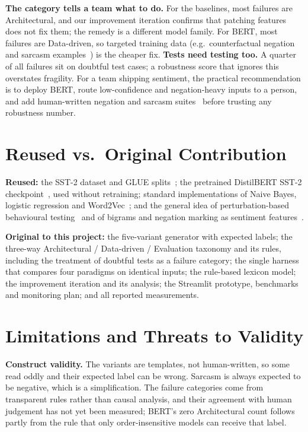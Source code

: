 \documentclass[conference]{IEEEtran}
\begin{document}
\textbf{The category tells a team what to do.} For the baselines, most failures are
Architectural, and our improvement iteration confirms that patching features does not fix them; the
remedy is a different model family. For BERT, most failures are Data-driven, so targeted training
data (e.g.\ counterfactual negation and sarcasm examples~\cite{kaushik2020}) is the cheaper fix.
\textbf{Tests need testing too.} A quarter of all failures sit on doubtful test cases; a robustness
score that ignores this overstates fragility. For a team shipping sentiment, the practical
recommendation is to deploy BERT, route low-confidence and negation-heavy inputs to a person, and
add human-written negation and sarcasm suites~\cite{ribeiro2020} before trusting any robustness
number.

\section{Reused vs.\ Original Contribution}\label{sec:contrib}
\textbf{Reused:} the SST-2 dataset and GLUE splits~\cite{socher2013,wang2019glue}; the pretrained
DistilBERT SST-2 checkpoint~\cite{sanh2019,wolf2020}, used without retraining; standard
implementations of Naive Bayes, logistic regression and Word2Vec~\cite{pedregosa2011,rehurek2010};
and the general idea of perturbation-based behavioural testing~\cite{ribeiro2020} and of bigrams and
negation marking as sentiment features~\cite{pang2002,wang2012}.

\textbf{Original to this project:} the five-variant generator with expected labels; the three-way
Architectural / Data-driven / Evaluation taxonomy and its rules, including the treatment of doubtful
tests as a failure category; the single harness that compares four paradigms on identical inputs;
the rule-based lexicon model; the improvement iteration and its analysis; the Streamlit prototype,
benchmarks and monitoring plan; and all reported measurements.

\section{Limitations and Threats to Validity}\label{sec:limits}
\textbf{Construct validity.} The variants are templates, not human-written, so some read oddly and
their expected label can be wrong. Sarcasm is always expected to be negative, which is a
simplification. The failure categories come from transparent rules rather than causal analysis,
and their agreement with human judgement has not yet been measured; BERT's zero Architectural count
follows partly from the rule that only order-insensitive models can receive that label.
\end{document}

